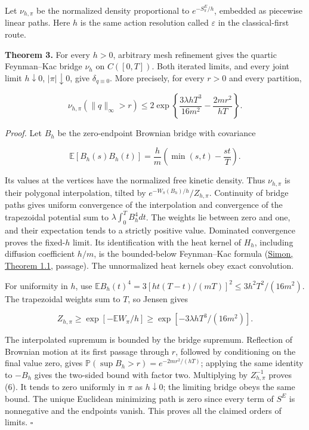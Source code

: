 \documentclass[11pt,a4paper]{article}
\begin{document}
Let \(\nu_{h,\pi}\) be the normalized density proportional to
\(e^{-S^E_\pi/h}\), embedded as piecewise linear paths. Here \(h\) is
the same action resolution called \(\varepsilon\) in the classical-first
route.

\textbf{Theorem 3.} For every \(h>0\), arbitrary mesh refinement gives
the quartic Feynman--Kac bridge \(\nu_h\) on \(C([0,T])\). Both iterated
limits, and every joint limit \(h\downarrow0\), \(|\pi|\downarrow0\),
give \(\delta_{q\equiv0}\). More precisely, for every \(r>0\) and every
partition,

\[
\nu_{h,\pi}(\|q\|_\infty>r)
\le 2\exp\left\{\frac{3\lambda hT^3}{16m^2}
-\frac{2mr^2}{hT}\right\}. \tag{6}
\]

\emph{Proof.} Let \(B_h\) be the zero-endpoint Brownian bridge with
covariance

\[
\mathbb E[B_h(s)B_h(t)]=\frac hm
\left(\min(s,t)-\frac{st}{T}\right).
\]

Its values at the vertices have the normalized free kinetic density.
Thus \(\nu_{h,\pi}\) is their polygonal interpolation, tilted by
\(e^{-W_\pi(B_h)/h}/Z_{h,\pi}\). Continuity of bridge paths gives
uniform convergence of the interpolation and convergence of the
trapezoidal potential sum to \(\lambda\int_0^T B_h^4dt\). The weights
lie between zero and one, and their expectation tends to a strictly
positive value. Dominated convergence proves the fixed-\(h\) limit. Its
identification with the heat kernel of \(H_h\), including diffusion
coefficient \(h/m\), is the bounded-below Feynman--Kac formula
(\href{https://arxiv.org/pdf/math-ph/9907022}{Simon, Theorem 1.1},
passage). The unnormalized heat kernels obey exact convolution.

For uniformity in \(h\), use
\(\mathbb E B_h(t)^4=3[ht(T-t)/(mT)]^2\le3h^2T^2/(16m^2)\). The
trapezoidal weights sum to \(T\), so Jensen gives

\[
Z_{h,\pi}\ge
\exp[-\mathbb E W_\pi/h]
\ge\exp[-3\lambda hT^3/(16m^2)].
\]

The interpolated supremum is bounded by the bridge supremum. Reflection
of Brownian motion at its first passage through \(r\), followed by
conditioning on the final value zero, gives
\(\mathbb P(\sup B_h>r)=e^{-2mr^2/(hT)}\); applying the same identity to
\(-B_h\) gives the two-sided bound with factor two. Multiplying by
\(Z_{h,\pi}^{-1}\) proves (6). It tends to zero uniformly in \(\pi\) as
\(h\downarrow0\); the limiting bridge obeys the same bound. The unique
Euclidean minimizing path is zero since every term of \(S^E\) is
nonnegative and the endpoints vanish. This proves all the claimed orders
of limits. \(\square\)
\end{document}
